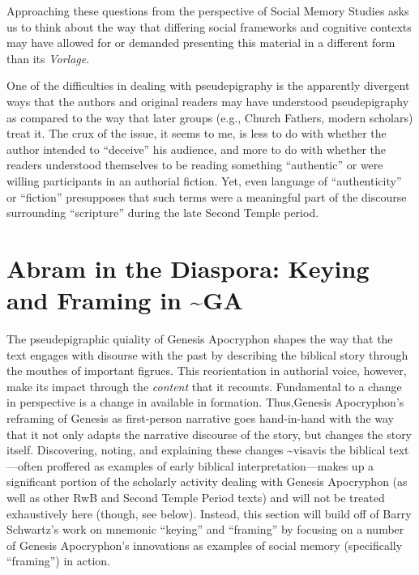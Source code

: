 Approaching these questions from the perspective of Social Memory
Studies asks us to think about the way that differing social frameworks
and cognitive contexts may have allowed for or demanded presenting this
material in a different form than its \emph{Vorlage}.

One of the difficulties in dealing with pseudepigraphy is the apparently
divergent ways that the authors and original readers may have understood
pseudepigraphy as compared to the way that later groups (e.g., Church
Fathers, modern scholars) treat it. The crux of the issue, it seems to
me, is less to do with whether the author intended to ``deceive'' his
audience, and more to do with whether the readers understood themselves
to be reading something ``authentic'' or were willing participants in an
authorial fiction. Yet, even language of ``authenticity'' or ``fiction''
presupposes that such terms were a meaningful part of the discourse
surrounding ``scripture'' during the late Second Temple period.

\hypertarget{abram-in-the-diaspora-keying-and-framing-in-ga}{%
\section{Abram in the Diaspora: Keying and Framing in
\textasciitilde{}GA}\label{abram-in-the-diaspora-keying-and-framing-in-ga}}

The pseudepigraphic quiality of Genesis Apocryphon shapes the way that
the text engages with disourse with the past by describing the biblical
story through the mouthes of important figrues. This reorientation in
authorial voice, however, make its impact through the \emph{content}
that it recounts. Fundamental to a change in perspective is a change in
available in formation. Thus,Genesis Apocryphon's reframing of Genesis
as first-person narrative goes hand-in-hand with the way that it not
only adapts the narrative discourse of the story, but changes the story
itself.\autocite[Here I am using the term ``story'' as a specific term
to refer to the events of the narrative in the abstract, which is to be
distinguished from any particular narrative instance of the story.][GET
PAGE]{abbott2008} Discovering, noting, and explaining these changes
\textasciitilde{}visavis the biblical text---often proffered as examples
of early biblical interpretation---makes up a significant portion of the
scholarly activity dealing with Genesis Apocryphon (as well as other RwB
and Second Temple Period texts) and will not be treated exhaustively
here (though, see below).\autocite[See especially][GET MORE OF
THESE]{bernstein_dsd1996} Instead, this section will build off of Barry
Schwartz's work on mnemonic ``keying'' and ``framing'' by focusing on a
number of Genesis Apocryphon's innovations as examples of social memory
(specifically ``framing'') in action.

